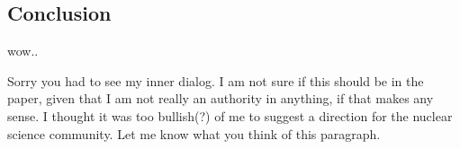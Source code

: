 \documentclass[answers,11pt]{exam}
\begin{document}
\begin{questions}
\section*{Conclusion}
        \question
         wow..

        \begin{solution}
            Sorry you had to see my inner dialog. I am not sure
            if this should be in the paper, given that I am not really
            an authority in anything, if that makes any sense. I thought
            it was too bullish(?) of me to suggest a direction for the
            nuclear science community. Let me know what you think of this
            paragraph.
        \end{solution}

        




\end{questions}


\end{document}
